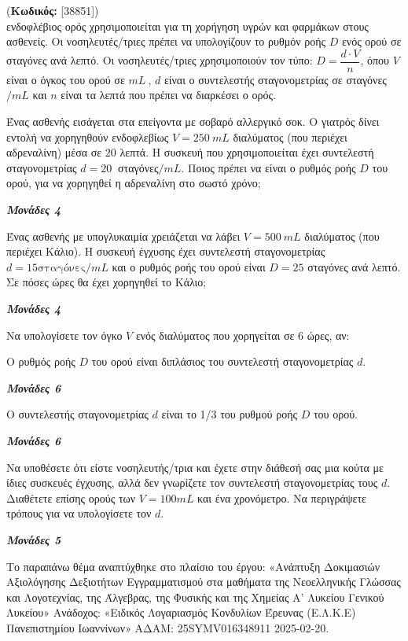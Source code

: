 \documentclass[11pt,a4paper,twoside]{book}
\newcounter{askhsh}[chapter]
\renewcommand{\theaskhsh}{
	\bf{\titlefont{\Large{\thechapter}}.\arabic{askhsh}}
}
\newcommand{\Askhsh}[2]{\refstepcounter{askhsh}{\titlefont{Άσκηση\theaskhsh} - \textcolor{maincolor}{ΘΕΜΑ #2}} (\small{\textbf{Κωδικός:} #1})\\}{}
\newcommand{\monades}[1]{
\hspace*{\fill}
\textbf{\textit{\textcolor{maincolor}{Μονάδες #1}}}}
\begin{document}
\vspace{4mm}

\Askhsh{[38851]}
Ο ενδοφλέβιος ορός χρησιμοποιείται για τη χορήγηση υγρών και φαρμάκων στους ασθενείς. Οι νοσηλευτές/τριες πρέπει να υπολογίζουν το ρυθμόν ροής $D$ ενός ορού σε σταγόνες ανά λεπτό. Οι νοσηλευτές/τριες χρησιμοποιούν τον τύπο:
$D = \dfrac{d \cdot V}{n}$, όπου
$V$ είναι ο όγκος του ορού σε $mL\ $,
$d$ είναι ο συντελεστής σταγονομετρίας σε σταγόνες$/mL$ και
$n$ είναι τα λεπτά που πρέπει να διαρκέσει ο ορός.
\begin{alist}
\item

\begin{rlist}
\item Ένας ασθενής εισάγεται στα επείγοντα με σοβαρό αλλεργικό σοκ. Ο γιατρός δίνει εντολή να χορηγηθούν ενδοφλεβίως $V = 250\ mL$ διαλύματος (που περιέχει αδρεναλίνη) μέσα σε $20$ λεπτά. Η συσκευή που χρησιμοποιείται έχει συντελεστή σταγονομετρίας $d = 20\ $ σταγόνες$/mL$. Ποιος πρέπει να είναι ο ρυθμός ροής $D$ του ορού, για να χορηγηθεί η αδρεναλίνη στο σωστό χρόνο;

\monades{4}
\item Ένας ασθενής με υπογλυκαιμία χρειάζεται να λάβει $V = 500\ mL$ διαλύματος (που περιέχει Κάλιο). Η συσκευή έγχυσης έχει συντελεστή σταγονομετρίας $d = 15\text{σταγόνες}/mL$ και ο ρυθμός ροής του ορού είναι $D = 25$ σταγόνες ανά λεπτό. Σε πόσες ώρες θα έχει χορηγηθεί το Κάλιο;
\monades{4}
\end{rlist}
\item Να υπολογίσετε τον όγκο $V$ ενός διαλύματος που χορηγείται σε $6$ ώρες, αν:

\begin{rlist}
\item Ο ρυθμός ροής $D$ του ορού είναι διπλάσιος του συντελεστή σταγονομετρίας $d$.

\monades{6}
\item Ο συντελεστής σταγονομετρίας $d$ είναι το 1/3 του ρυθμού ροής $D$ του ορού.

\monades{6}
\end{rlist}
\item Να υποθέσετε ότι είστε νοσηλευτής/τρια και έχετε στην διάθεσή σας μια κούτα με ίδιες συσκευές έγχυσης, αλλά δεν γνωρίζετε τον συντελεστή σταγονομετρίας τους $d$. Διαθέτετε επίσης ορούς των $V = 100mL$ και ένα χρονόμετρο. Να περιγράψετε τρόπους για να υπολογίσετε τον $d$.
\monades{5}

{\footnotesize Το παραπάνω θέμα αναπτύχθηκε στο πλαίσιο του έργου: «Ανάπτυξη Δοκιμασιών Αξιολόγησης Δεξιοτήτων Εγγραμματισμού στα μαθήματα της Νεοελληνικής Γλώσσας και Λογοτεχνίας, της Άλγεβρας, της Φυσικής και της Χημείας Α' Λυκείου Γενικού Λυκείου» Ανάδοχος: «Ειδικός Λογαριασμός Κονδυλίων Έρευνας (Ε.Λ.Κ.Ε) Πανεπιστημίου Ιωαννίνων» ΑΔΑΜ: 25SYMV016348911 2025-02-20.}
\end{alist}
\end{document}

